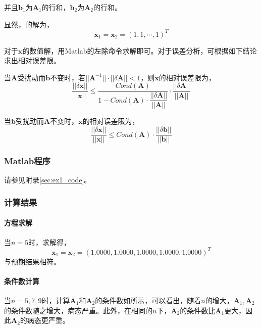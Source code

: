 \documentclass[12pt,a4paper]{article}
\begin{document}
并且$\boldsymbol{b}_1$为$\boldsymbol{A}_1$的行和，$\boldsymbol{b}_2$为$\boldsymbol{A}_2$的行和。

显然，的解为，
\begin{equation}
    \boldsymbol{x}_1 = \boldsymbol{x}_2 = (1,1,\cdots,1)^T
\end{equation}

对于$\boldsymbol{x}$的数值解，用Matlab的左除命令求解即可。对于误差分析，可根据如下结论求出相对误差限。

当$\boldsymbol{A}$受扰动而$\boldsymbol{b}$不变时，若$||\boldsymbol{A}^{-1}||\cdot||\delta\boldsymbol{A}|| < 1$，则$\boldsymbol{x}$的相对误差限为，
\begin{equation}
    \frac{||\delta \boldsymbol{x}||}{||\boldsymbol{x}||} \le \frac{Cond(\boldsymbol{A})}{1-Cond(\boldsymbol{A})\cdot\dfrac{||\delta \boldsymbol{A}||}{||\boldsymbol{A}||}} \cdot \frac{||\delta \boldsymbol{A}||}{||\boldsymbol{A}||}
\end{equation}

当$\boldsymbol{b}$受扰动而$\boldsymbol{A}$不变时，$\boldsymbol{x}$的相对误差限为，
\begin{equation}
    \frac{||\delta \boldsymbol{x}||}{||\boldsymbol{x}||} \le Cond(\boldsymbol{A}) \cdot \frac{||\delta \boldsymbol{b}||}{||\boldsymbol{b}||}
\end{equation}

\subsubsection{Matlab程序}

请参见附录\ref{sec:ex1_code}。

\subsubsection{计算结果}

\paragraph{方程求解} 当$n=5$时，求解得，
\begin{equation}
    \boldsymbol{x}_1 = \boldsymbol{x}_2 = (1.0000,1.0000,1.0000,1.0000,1.0000)^T
\end{equation}
与预期结果相符。

\paragraph{条件数计算} 当$n=5,7,9$时，计算$\boldsymbol{A}_1$和$\boldsymbol{A}_2$的条件数如所示，可以看出，随着$n$的增大，$\boldsymbol{A}_1,\boldsymbol{A}_2$的条件数随之增大，病态严重。此外，在相同的$n$下，$\boldsymbol{A}_2$的条件数比$\boldsymbol{A}_1$更大，因此$\boldsymbol{A}_2$的病态更严重。
\end{document}

